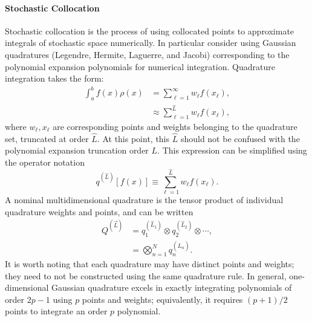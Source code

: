 \paragraph{Stochastic Collocation}\label{sec:stoch coll}
Stochastic collocation is the process of using collocated points to approximate integrals of stochastic space
numerically.  In particular consider using Gaussian quadratures (Legendre, Hermite, Laguerre, and Jacobi)
corresponding to the polynomial expansion polynomials for numerical integration.  Quadrature integration takes
the form:
\begin{align}
  \int_a^b f(x)\rho(x) &= \sum_{\ell=1}^\infty w_\ell f(x_\ell),\\
  &\approx \sum_{\ell=1}^{\hat L} w_\ell f(x_\ell),
\end{align}
where $w_\ell,x_\ell$ are corresponding points and weights belonging to the quadrature set, truncated at order
$\hat L$.  At this point, this $\hat L$ should not be confused with the polynomial expansion truncation order $L$.  This expression can be simplified using the operator notation
\begin{equation}\label{eq:quad op}
  q^{(\hat L)}[f(x)] \equiv \sum_{\ell=1}^{\hat L} w_\ell f(x_\ell).
\end{equation}
A nominal multidimensional quadrature is the tensor product of
individual quadrature weights and points, and can be written
\begin{align}
  Q^{(\vec{L})} &= q^{(\hat L_1)}_1 \otimes q^{(\hat L_2)}_2 \otimes \cdots,\\
                     &= \bigotimes_{n=1}^N q^{(\hat L_n)}_n.
\end{align}
It is worth noting that each quadrature may have distinct points and weights; they need to not be constructed using
the same quadrature rule.
In general, one-dimensional Gaussian
quadrature excels in exactly integrating polynomials of order $2p-1$ using $p$ points and weights;
equivalently, it requires $(p+1)/2$ points to integrate an order $p$ polynomial.


